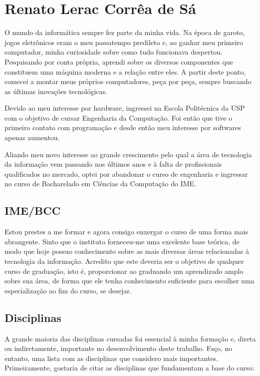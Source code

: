 \newpage
\section{Renato Lerac Corrêa de Sá}
\label{sec:renato_subjetiva}

O mundo da informática sempre fez parte da minha vida. Na época de garoto, jogos eletrônicos eram o
meu passatempo predileto e, ao ganhar meu primeiro computador, minha curiosidade sobre como tudo
funcionava despertou. Pesquisando por conta própria, aprendi sobre os diversos componentes que
constituem uma máquina moderna e a relação entre eles. A partir deste ponto, comecei a montar meus
próprios computadores, peça por peça, sempre buscando as últimas inovações tecnológicas.

Devido ao meu interesse por hardware, ingressei na Escola Politécnica da USP com o objetivo de
cursar Engenharia da Computação. Foi então que tive o primeiro contato com programação e desde então
meu interesse por softwares apenas aumentou.

Aliando meu novo interesse ao grande crescimento pelo qual a área de tecnologia da informação
vem passando nos últimos anos e à falta de profissionais qualificados no mercado, optei por
abandonar o curso de engenharia e ingressar no curso de Bacharelado em Ciências da Computação do
IME.

\subsection{IME/BCC}

Estou prestes a me formar e agora consigo enxergar o curso de uma forma mais abrangente. Sinto que o
instituto forneceu-me uma excelente base teórica, de modo que hoje possuo conhecimento sobre as mais
diversas áreas relacionadas à tecnologia da informação. Acredito que este deveria ser o objetivo de
qualquer curso de graduação, isto é, proporcionar ao graduando um aprendizado amplo sobre sua área,
de forma que ele tenha conhecimento suficiente para escolher uma especialização ao fim do curso, se
desejar.

\subsection{Disciplinas}

A grande maioria das disciplinas cursadas foi essencial à minha formação e, direta ou
indiretamente, importante no desenvolvimento deste trabalho. Faço, no entanto, uma lista
com as disciplinas que considero mais importantes. Primeiramente, gostaria de citar as disciplinas
que fundamentam a base do curso:

